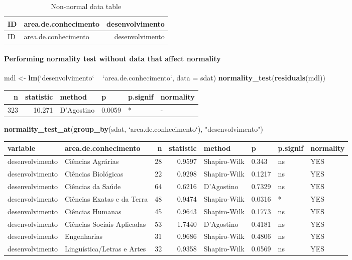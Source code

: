 \documentclass[]{article}
\newenvironment{Shaded}{\begin{snugshade}}{\end{snugshade}}
\newcommand{\DataTypeTok}[1]{\textcolor[rgb]{0.13,0.29,0.53}{#1}}
\newcommand{\KeywordTok}[1]{\textcolor[rgb]{0.13,0.29,0.53}{\textbf{#1}}}
\newcommand{\NormalTok}[1]{#1}
\newcommand{\OperatorTok}[1]{\textcolor[rgb]{0.81,0.36,0.00}{\textbf{#1}}}
\newcommand{\StringTok}[1]{\textcolor[rgb]{0.31,0.60,0.02}{#1}}
\let\oldparagraph\paragraph
\renewcommand{\paragraph}[1]{\oldparagraph{#1}\mbox{}}
\begin{document}
\begin{longtable}[]{@{}llr@{}}
\caption{Non-normal data table}\tabularnewline
\toprule
ID & area.de.conhecimento & desenvolvimento\tabularnewline
\midrule
\endfirsthead
\toprule
ID & area.de.conhecimento & desenvolvimento\tabularnewline
\midrule
\endhead
\bottomrule
\end{longtable}

\hypertarget{performing-normality-test-without-data-that-affect-normality}{%
\paragraph{Performing normality test without data that affect
normality}\label{performing-normality-test-without-data-that-affect-normality}}

\begin{Shaded}
\begin{Highlighting}[]
\NormalTok{mdl <-}\StringTok{ }\KeywordTok{lm}\NormalTok{(}\StringTok{`}\DataTypeTok{desenvolvimento}\StringTok{`} \OperatorTok{~}\StringTok{ `}\DataTypeTok{area.de.conhecimento}\StringTok{`}\NormalTok{, }\DataTypeTok{data =}\NormalTok{ sdat)}
\KeywordTok{normality_test}\NormalTok{(}\KeywordTok{residuals}\NormalTok{(mdl))}
\end{Highlighting}
\end{Shaded}

\begin{longtable}[]{@{}rrllll@{}}
\toprule
n & statistic & method & p & p.signif & normality\tabularnewline
\midrule
\endhead
323 & 10.271 & D'Agostino & 0.0059 & * & -\tabularnewline
\bottomrule
\end{longtable}

\begin{Shaded}
\begin{Highlighting}[]
\KeywordTok{normality_test_at}\NormalTok{(}\KeywordTok{group_by}\NormalTok{(sdat, }\StringTok{`}\DataTypeTok{area.de.conhecimento}\StringTok{`}\NormalTok{), }\StringTok{"desenvolvimento"}\NormalTok{)}
\end{Highlighting}
\end{Shaded}

\begin{longtable}[]{@{}llrrllll@{}}
\toprule
variable & area.de.conhecimento & n & statistic & method & p & p.signif
& normality\tabularnewline
\midrule
\endhead
desenvolvimento & Ciências Agrárias & 28 & 0.9597 & Shapiro-Wilk & 0.343
& ns & YES\tabularnewline
desenvolvimento & Ciências Biológicas & 22 & 0.9298 & Shapiro-Wilk &
0.1217 & ns & YES\tabularnewline
desenvolvimento & Ciências da Saúde & 64 & 0.6216 & D'Agostino & 0.7329
& ns & YES\tabularnewline
desenvolvimento & Ciências Exatas e da Terra & 48 & 0.9474 &
Shapiro-Wilk & 0.0316 & * & YES\tabularnewline
desenvolvimento & Ciências Humanas & 45 & 0.9643 & Shapiro-Wilk & 0.1773
& ns & YES\tabularnewline
desenvolvimento & Ciências Sociais Aplicadas & 53 & 1.7440 & D'Agostino
& 0.4181 & ns & YES\tabularnewline
desenvolvimento & Engenharias & 31 & 0.9686 & Shapiro-Wilk & 0.4806 & ns
& YES\tabularnewline
desenvolvimento & Linguística/Letras e Artes & 32 & 0.9358 &
Shapiro-Wilk & 0.0569 & ns & YES\tabularnewline
\bottomrule
\end{longtable}
\end{document}
